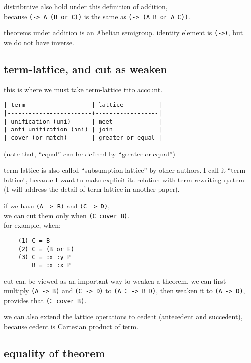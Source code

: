 \documentclass{sigplanconf}
\begin{document}
distributive also hold under this definition of addition, \\
because {\scriptsize\verb|(-> A (B or C))|} is the same as {\scriptsize\verb|(-> (A B or A C))|}.

theorems under addition is an Abelian semigroup.
identity element is {\scriptsize\verb|(->)|},
but we do not have inverse.

\subsection{term-lattice, and cut as weaken}

this is where we must take term-lattice into account.

{\scriptsize\begin{verbatim}
| term                   | lattice          |
|------------------------+------------------|
| unification (uni)      | meet             |
| anti-unification (ani) | join             |
| cover (or match)       | greater-or-equal |
\end{verbatim}}

(note that, ``equal'' can be defined by ``greater-or-equal'')

term-lattice is also called ``subsumption lattice'' by other authors.
I call it ``term-lattice'',
because I want to make explicit its relation with term-rewriting-system
(I will address the detail of term-lattice in another paper).

if we have {\scriptsize\verb|(A -> B)|} and {\scriptsize\verb|(C -> D)|}, \\
we can cut them only when {\scriptsize\verb|(C cover B)|}. \\
for example, when:

{\scriptsize\begin{verbatim}
    (1) C = B
    (2) C = (B or E)
    (3) C = :x :y P
        B = :x :x P
\end{verbatim}}

cut can be viewed as an important way to weaken a theorem.
we can first multiply {\scriptsize\verb|(A -> B)|} and {\scriptsize\verb|(C -> D)|} to {\scriptsize\verb|(A C -> B D)|},
then weaken it to {\scriptsize\verb|(A -> D)|}, provides that {\scriptsize\verb|(C cover B)|}.

we can also extend the lattice operations to cedent (antecedent and succedent),
because cedent is Cartesian product of term.

\subsection{equality of theorem}
\end{document}
